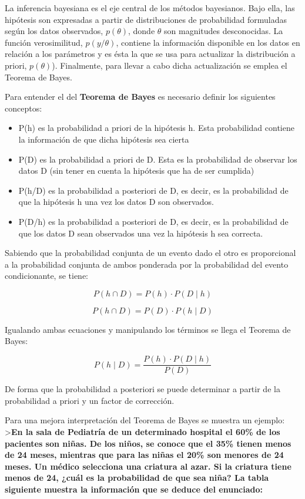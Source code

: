 \documentclass[
  a4paper,
  DIV=11,
  numbers=noendperiod]{scrreprt}
\providecommand{\tightlist}{%
  \setlength{\itemsep}{0pt}\setlength{\parskip}{0pt}}\usepackage{longtable,booktabs,array}
\begin{document}
La inferencia bayesiana es el eje central de los métodos bayesianos.
Bajo ella, las hipótesis son expresadas a partir de distribuciones de
probabilidad formuladas según los datos observados, \(p(\theta)\), donde
\(\theta\) son magnitudes desconocidas. La función verosimilitud,
\(p(y/\theta)\), contiene la información disponible en los datos en
relación a los parámetros y es ésta la que se usa para actualizar la
distribución a priori, \(p(\theta)\)). Finalmente, para llevar a cabo
dicha actualización se emplea el Teorema de Bayes.

Para entender el del \textbf{Teorema de Bayes} es necesario definir los
siguientes conceptos:

\begin{itemize}
\tightlist
\item
  P(h) es la probabilidad a priori de la hipótesis h. Esta probabilidad
  contiene la información de que dicha hipótesis sea cierta
\item
  P(D) es la probabilidad a priori de D. Esta es la probabilidad de
  observar los datos D (sin tener en cuenta la hipótesis que ha de ser
  cumplida)
\item
  P(h/D) es la probabilidad a posteriori de D, es decir, es la
  probabilidad de que la hipótesis h una vez los datos D son observados.
\item
  P(D/h) es la probabilidad a posteriori de D, es decir, es la
  probabilidad de que los datos D sean observados una vez la hipótesis h
  sea correcta.
\end{itemize}

Sabiendo que la probabilidad conjunta de un evento dado el otro es
proporcional a la probabilidad conjunta de ambos ponderada por la
probabilidad del evento condicionante, se tiene:

\[
P(h \cap D) = P(h) \cdot P(D \mid h)
\]

\[
P(h \cap D) = P(D) \cdot P(h \mid D)
\]

Igualando ambas ecuaciones y manipulando los términos se llega el
Teorema de Bayes:

\[
P(h \mid D) = \frac{P(h) \cdot P(D \mid h)}{P(D)}
\]

De forma que la probabilidad a posteriori se puede determinar a partir
de la probabilidad a priori y un factor de corrección.

Para una mejora interpretación del Teorema de Bayes se muestra un
ejemplo: \textgreater{}\textbf{En la sala de Pediatría de un determinado
hospital el 60\% de los pacientes son niñas. De los niños, se conoce que
el 35\% tienen menos de 24 meses, mientras que para las niñas el 20\%
son menores de 24 meses. Un médico selecciona una criatura al azar. Si
la criatura tiene menos de 24, ¿cuál es la probabilidad de que sea niña?
La tabla siguiente muestra la información que se deduce del enunciado:}
\end{document}
